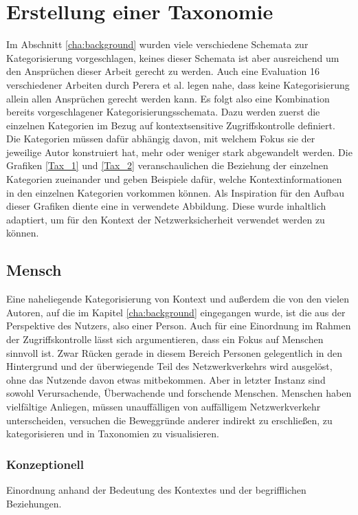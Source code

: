 \section{ Erstellung einer Taxonomie }
Im Abschnitt \ref{cha:background} wurden viele verschiedene Schemata zur Kategorisierung vorgeschlagen, keines dieser Schemata ist aber ausreichend um den Ansprüchen dieser Arbeit gerecht zu werden. Auch eine Evaluation 16 verschiedener Arbeiten durch Perera et al. \cite{perera_context_2014} legen nahe, dass keine Kategorisierung allein allen Ansprüchen gerecht werden kann.
Es folgt also eine Kombination bereits vorgeschlagener Kategorisierungsschemata. Dazu werden zuerst die einzelnen Kategorien im Bezug auf kontextsensitive Zugriffskontrolle definiert. Die Kategorien müssen dafür abhängig davon, mit welchem Fokus sie der jeweilige Autor konstruiert hat, mehr oder weniger stark abgewandelt werden.
Die Grafiken \ref{Tax_1} und \ref{Tax_2} veranschaulichen die Beziehung der einzelnen Kategorien zueinander und geben Beispiele dafür, welche Kontextinformationen in den einzelnen Kategorien vorkommen können. Als Inspiration für den Aufbau dieser Grafiken diente eine in \cite{perera_context_2014} verwendete Abbildung. Diese wurde inhaltlich adaptiert, um für den Kontext der Netzwerksicherheit verwendet werden zu können. 
\subsection{Mensch}
Eine naheliegende Kategorisierung von Kontext und außerdem die von den vielen Autoren, auf die im Kapitel \ref{cha:background} eingegangen wurde, ist die aus der Perspektive des Nutzers, also einer Person. Auch für eine Einordnung im Rahmen der Zugriffskontrolle lässt sich argumentieren, dass ein Fokus auf Menschen sinnvoll ist. Zwar Rücken gerade in diesem Bereich Personen gelegentlich in den Hintergrund und der überwiegende Teil des Netzwerkverkehrs wird ausgelöst, ohne das Nutzende davon etwas mitbekommen. Aber in letzter Instanz sind sowohl Verursachende, Überwachende und forschende Menschen. Menschen haben vielfältige Anliegen, müssen unauffälligen von auffälligem Netzwerkverkehr unterscheiden, versuchen die Beweggründe anderer indirekt zu erschließen, zu kategorisieren und in Taxonomien zu visualisieren.

\subsubsection{Konzeptionell}
Einordnung anhand der Bedeutung des Kontextes und der begrifflichen Beziehungen.
